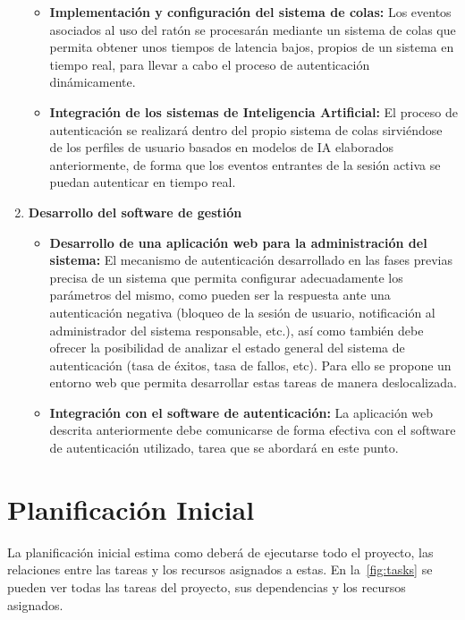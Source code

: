 \begin{enumerate}[noitemsep]
\begin{itemize}
        \item \textbf{Implementación y configuración del sistema de colas:} Los eventos asociados al uso del ratón se procesarán mediante un sistema de colas que permita obtener unos tiempos de latencia bajos, propios de un sistema en tiempo real, para llevar a cabo el proceso de autenticación dinámicamente.
        \item \textbf{Integración de los sistemas de Inteligencia Artificial:} El proceso de autenticación se realizará dentro del propio sistema de colas sirviéndose de los perfiles de usuario basados en modelos de IA elaborados anteriormente, de forma que los eventos entrantes de la sesión activa se puedan autenticar en tiempo real.
    \end{itemize}
    \item \textbf{Desarrollo del software de gestión}
    \begin{itemize}
        \item \textbf{Desarrollo de una aplicación web para la administración del sistema:} El mecanismo de autenticación desarrollado en las fases previas precisa de un sistema que permita configurar adecuadamente los parámetros del mismo, como pueden ser la respuesta ante una autenticación negativa (bloqueo de la sesión de usuario, notificación al administrador del sistema responsable, etc.), así como también debe ofrecer la posibilidad de analizar el estado general del sistema de autenticación (tasa de éxitos, tasa de fallos, etc). Para ello se propone un entorno web que permita desarrollar estas tareas de manera deslocalizada.
        \item \textbf{Integración con el software de autenticación:} La aplicación web descrita anteriormente debe comunicarse de forma efectiva con el software de autenticación utilizado, tarea que se abordará en este punto.
    \end{itemize}
\end{enumerate}

\section{Planificación Inicial}
\label{sec:manager:plan}
La planificación inicial estima como deberá de ejecutarse todo el proyecto, las relaciones entre las tareas y los recursos asignados a estas. En la~\cref{fig:tasks} se pueden ver todas las tareas del proyecto, sus dependencias y los recursos asignados.


